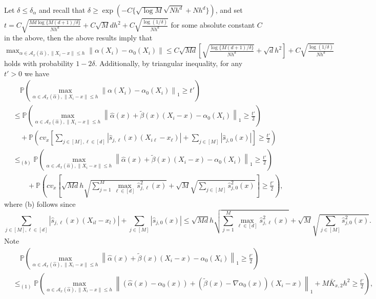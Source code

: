 \documentclass[11pt]{article}
\newcommand{\norm}[1]{\left\lVert #1 \right\rVert}
\begin{document}
Let $\delta\leq\delta_{\alpha}$ and recall that $\delta\geq\exp(-C\{\sqrt{\log M}\sqrt{Nh^d}+Nh^d\})$, and set $t=C\sqrt{\frac{Md\log\{M(d+1)/\delta\}}{Nh^d}}+C\sqrt{M}dh^2+C\sqrt{\frac{\log(1/\delta)}{Nh^d}}$ for some absolute constant $C$ in the above, then the above results imply that $\max_{\alpha \in \mathcal{A}_x(\hat\alpha), \|X_i-x\|\leq h}\norm{\alpha(X_i)-\alpha_0(X_i)}\leq C\sqrt{Md}\left[\sqrt{\frac{\log\{M(d+1)/\delta\}}{Nh^d}}+\sqrt{d}h^2\right]+C\sqrt{\frac{\log(1/\delta)}{Nh^d}}$ holds with probability $1-2\delta$. Additionally, by triangular inequality, for any $t'>0$ we have 
$$\begin{array}{rl}
&\displaystyle\quad\mathbb{P}\left(\max_{\alpha \in \mathcal{A}_x(\hat\alpha), \|X_i-x\|\leq h}\norm{\alpha(X_i)-\alpha_0(X_i)}_1\geq t'\right)\\
&\displaystyle\leq\mathbb{P}\left(\max_{\alpha \in \mathcal{A}_x(\hat\alpha), \|X_i-x\|\leq h}\norm{\hat{\alpha}(x)+\tilde{\beta}(x)(X_i-x)-\alpha_0(X_i)}_1\!\!\geq\!\frac{t'}{2}\right)\\
&\displaystyle\quad+\mathbb{P}\left(\!cv_{x}\!\!\left[\sum_{j\in[M],\ell\in[d]}\!\!\!\!\!\!\!\!\!\!\!|\hat{s}_{j,\ell}(x)(X_{i\ell}-x_{\ell})|+\!\!\!\!\!\sum_{j\in[M]}\!\!\!\!|\hat{s}_{j,0}(x)|\right]\geq\frac{t'}{2}\right)\\
&\displaystyle\leq_{(b)}\mathbb{P}\left(\max_{\alpha \in \mathcal{A}_x(\hat\alpha), \|X_i-x\|\leq h}\norm{\hat{\alpha}(x)+\tilde{\beta}(x)(X_i-x)-\alpha_0(X_i)}_1\geq\frac{t'}{2}\right)\\
&\displaystyle\quad\quad+\mathbb{P}\left(cv_{x}\left[\sqrt{Md}h\sqrt{\sum_{j=1}^M\max_{\ell\in[d]}\hat{s}_{j,\ell}^2(x)}+\sqrt{M}\sqrt{\sum_{j\in[M]}\hat{s}_{j,0}^2(x)}\right]\geq\frac{t'}{2}\right),
\end{array}$$
where (b) follows since
$$\sum_{j\in[M],\ell\in[d]}|\hat{s}_{j,\ell}(x)(X_{il}-x_{l})|+\sum_{j\in[M]}|\hat{s}_{j,0}(x)|\leq\sqrt{Md}h\sqrt{\sum_{j=1}^M\max_{\ell\in[d]}\hat{s}_{j,\ell}^2(x)}+\sqrt{M}\sqrt{\sum_{j\in[M]}\hat{s}_{j,0}^2(x)}.$$ 
Note 
$$\begin{array}{rl}
&\displaystyle\quad\mathbb{P}\left(\max_{\alpha \in \mathcal{A}_x(\hat\alpha), \|X_i-x\|\leq h}\norm{\hat{\alpha}(x)+\tilde{\beta}(x)(X_i-x)-\alpha_0(X_i)}_1\geq\frac{t'}{2}\right)\\
&\displaystyle\leq_{(1)}\mathbb{P}\left(\max_{\alpha \in \mathcal{A}_x(\hat\alpha), \|X_i-x\|\leq h}\norm{(\hat{\alpha}(x)-\alpha_0(x))+(\tilde{\beta}(x)-\nabla\alpha_0(x))(X_i-x)}_1+M\bar{K}_{x,2}h^2\geq\frac{t'}{2}\right),
\end{array}$$
\end{document}
